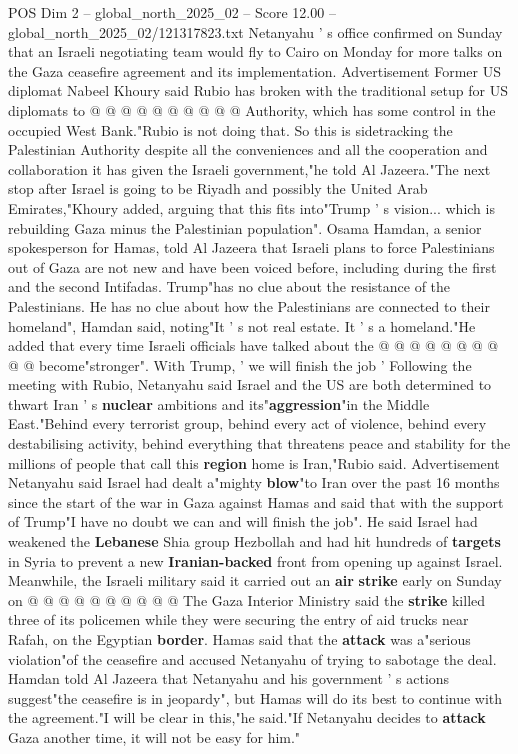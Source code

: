 \begin{textsample}{POS Dim 2 – global\_north\_2025\_02 – Score 12.00 – global\_north\_2025\_02/121317823.txt}
Netanyahu ' s office confirmed on Sunday that an Israeli negotiating team would fly to Cairo on Monday for more talks on the Gaza ceasefire agreement and its implementation.
Advertisement Former US diplomat Nabeel Khoury said Rubio has broken with the traditional setup for US diplomats to @ @ @ @ @ @ @ @ @ @ Authority, which has some control in the occupied West Bank."Rubio is not doing that.
So this is sidetracking the Palestinian Authority despite all the conveniences and all the cooperation and collaboration it has given the Israeli government,"he told Al Jazeera."The next stop after Israel is going to be Riyadh and possibly the United Arab Emirates,"Khoury added, arguing that this fits into"Trump ' s vision... which is rebuilding Gaza minus the Palestinian population".
Osama Hamdan, a senior spokesperson for Hamas, told Al Jazeera that Israeli plans to force Palestinians out of Gaza are not new and have been voiced before, including during the first and the second Intifadas.
Trump"has no clue about the resistance of the Palestinians.
He has no clue about how the Palestinians are connected to their homeland", Hamdan said, noting"It ' s not real estate.
It ' s a homeland."He added that every time Israeli officials have talked about the @ @ @ @ @ @ @ @ @ @ become"stronger".
With Trump, ' we will finish the job ' Following the meeting with Rubio, Netanyahu said Israel and the US are both determined to thwart Iran ' s \textbf{nuclear} ambitions and its"\textbf{aggression}"in the Middle East."Behind every terrorist group, behind every act of violence, behind every destabilising activity, behind everything that threatens peace and stability for the millions of people that call this \textbf{region} home is Iran,"Rubio said.
Advertisement Netanyahu said Israel had dealt a"mighty \textbf{blow}"to Iran over the past 16 months since the start of the war in Gaza against Hamas and said that with the support of Trump"I have no doubt we can and will finish the job".
He said Israel had weakened the \textbf{Lebanese} Shia group Hezbollah and had hit hundreds of \textbf{targets} in Syria to prevent a new \textbf{Iranian-backed} front from opening up against Israel.
Meanwhile, the Israeli military said it carried out an \textbf{air} \textbf{strike} early on Sunday on @ @ @ @ @ @ @ @ @ @ The Gaza Interior Ministry said the \textbf{strike} killed three of its policemen while they were securing the entry of aid trucks near Rafah, on the Egyptian \textbf{border}.
Hamas said that the \textbf{attack} was a"serious violation"of the ceasefire and accused Netanyahu of trying to sabotage the deal.
Hamdan told Al Jazeera that Netanyahu and his government ' s actions suggest"the ceasefire is in jeopardy", but Hamas will do its best to continue with the agreement."I will be clear in this,"he said."If Netanyahu decides to \textbf{attack} Gaza another time, it will not be easy for him."

\end{textsample}
